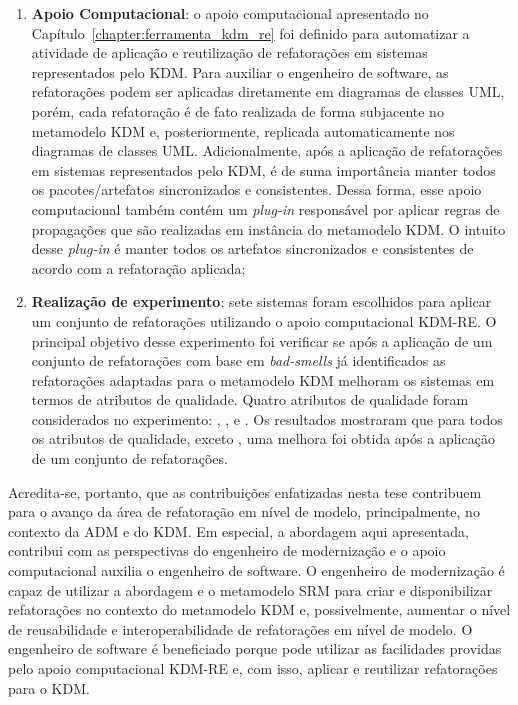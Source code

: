 \begin{enumerate}
\item \textbf{Apoio Computacional}: o apoio computacional apresentado no Capítulo~\ref{chapter:ferramenta_kdm_re} foi definido para automatizar a atividade de aplicação e reutilização de refatorações em sistemas representados pelo KDM. Para auxiliar o engenheiro de software, as refatorações podem ser aplicadas diretamente em diagramas de classes UML, porém, cada refatoração é de fato realizada de forma subjacente no metamodelo KDM e, posteriormente, replicada automaticamente nos diagramas de classes UML. Adicionalmente, após a aplicação de refatorações em sistemas representados pelo KDM, é de suma importância manter todos os pacotes/artefatos sincronizados e consistentes. Dessa forma, esse apoio computacional também contém um \textit{plug-in} responsável por aplicar regras de propagações que são realizadas em instância do metamodelo KDM. O intuito desse \textit{plug-in} é manter todos os artefatos sincronizados e consistentes de acordo com a refatoração aplicada;

\item \textbf{Realização de experimento}: sete sistemas foram escolhidos para aplicar um conjunto de refatorações utilizando o apoio computacional KDM-RE. O principal objetivo desse experimento foi verificar se após a aplicação de um conjunto de refatorações com base em \textit{bad-smells} já identificados as refatorações adaptadas para o metamodelo KDM melhoram os sistemas em termos de atributos de qualidade. Quatro atributos de qualidade foram considerados no experimento: , ,  e . Os resultados mostraram que para todos os atributos de qualidade, exceto , uma melhora foi obtida após a aplicação de um conjunto de refatorações.

\end{enumerate}

Acredita-se, portanto, que as contribuições enfatizadas nesta tese contribuem para o avanço da área de refatoração em nível de modelo, principalmente, no contexto da ADM e do KDM. Em especial, a abordagem aqui apresentada, contribui com as perspectivas do engenheiro de modernização e o apoio computacional auxilia o engenheiro de software. O engenheiro de modernização é capaz de utilizar a abordagem e o metamodelo SRM para criar e disponibilizar refatorações no contexto do metamodelo KDM e, possivelmente, aumentar o nível de reusabilidade e interoperabilidade de refatorações em nível de modelo. O engenheiro de software é beneficiado porque pode utilizar as facilidades providas pelo apoio computacional KDM-RE e, com isso, aplicar e reutilizar refatorações para o KDM.


